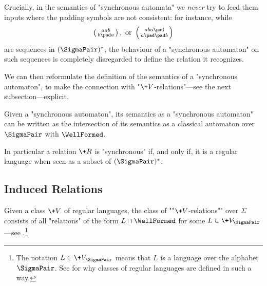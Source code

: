 \begin{remark}
	\AP\label{rk:semantic}
	Crucially, in the semantics of "synchronous automata" we \emph{never}
	try to feed them inputs where the padding symbols are not consistent: for instance, while
	\[
		\pair{aab}{b\pad a},
		\text{ or }
		\pair{aba\pad}{a\pad\pad b}	
	\]
	are sequences in $(\SigmaPair)^*$, the behaviour of a "synchronous automaton"
	on such sequences is completely disregarded to define the relation it recognizes. 
\end{remark}

We can then reformulate the definition of the semantics of a "synchronous automaton",
to make the connection with "$\+V$-relations"---see the next subsection---explicit.

\begin{fact}
	\AP\label{fact:synchronous-is-regular}
	Given a "synchronous automaton", its semantics as a "synchronous automaton"
	can be written as the intersection of its semantics as a classical automaton over $\SigmaPair$
	with $\WellFormed$.
\end{fact}

In particular a relation $\+R$ is "synchronous" if, and only if, it is a regular language when seen as a subset of $(\SigmaPair)^*$.

\subsection{Induced Relations}

Given a class $\+V$ of regular languages,
the class of \AP""$\+V$-relations"" over $\Sigma$ consists of all "relations"
of the form $L \cap \WellFormed$ for some $L \in \+V_{\SigmaPair}$---see .\footnote{The notation $L \in \+V_{\SigmaPair}$ means that $L$ is a language over
the alphabet $\SigmaPair$. See \cite[introduction of \S{}XIII.1]{pin_mathematical_2022}
for why classes of regular languages are defined in such a way.}


